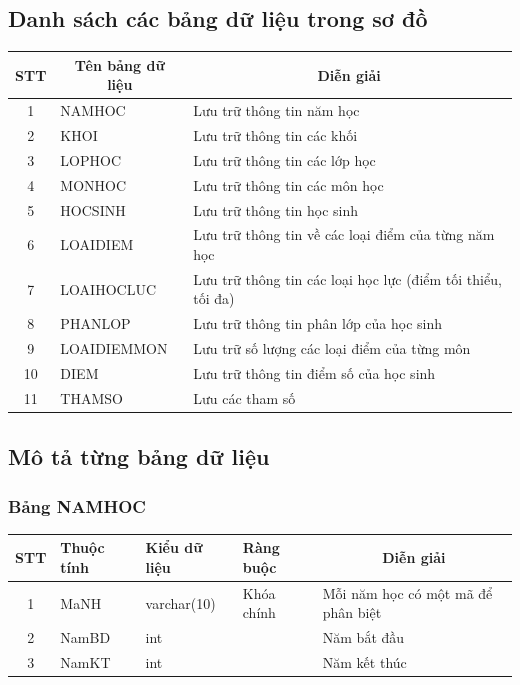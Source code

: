 \documentclass[a4paper]{article}
\begin{document}
	\subsection{Danh sách các bảng dữ liệu trong sơ đồ}
	\begin{table}[H]
\centering
\renewcommand{\arraystretch}{1.5}
\setlength{\tabcolsep}{12pt}
\begin{tabular}{|c|l|p{10cm}|}
\hline
\textbf{STT} & \multicolumn{1}{|c|}{\textbf{Tên bảng dữ liệu}} & \multicolumn{1}{|c|}{\textbf{Diễn giải}} \\
\hline
1 & NAMHOC & Lưu trữ thông tin năm học\\
\hline
2 & KHOI & Lưu trữ thông tin các khối\\
\hline
3 & LOPHOC & Lưu trữ thông tin các lớp học\\
\hline
4 & MONHOC & Lưu trữ thông tin các môn học\\
\hline
5 & HOCSINH & Lưu trữ thông tin học sinh\\
\hline
6 & LOAIDIEM & Lưu trữ thông tin về các loại điểm của từng năm học\\
\hline
7 & LOAIHOCLUC & Lưu trữ thông tin các loại học lực (điểm tối thiểu, tối đa)\\
\hline
8 & PHANLOP & Lưu trữ thông tin phân lớp của học sinh\\
\hline
9 & LOAIDIEMMON & Lưu trữ số lượng các loại điểm của từng môn\\
\hline
10 & DIEM & Lưu trữ thông tin điểm số của học sinh\\
\hline
11 & THAMSO & Lưu các tham số\\
\hline

\end{tabular}
\end{table}
	\subsection{Mô tả từng bảng dữ liệu}
\subsubsection{Bảng NAMHOC}
\begin{table}[H]
\centering
\renewcommand{\arraystretch}{1.5}
\setlength{\tabcolsep}{12pt}
\begin{tabular}{|c|l|l|l|p{5cm}|}
\hline
\textbf{STT} & \textbf{Thuộc tính} & \textbf{Kiểu dữ liệu} & \textbf{Ràng buộc} & \multicolumn{1}{|c|}{\textbf{Diễn giải}} \\
\hline
1 & MaNH & varchar(10) & Khóa chính & Mỗi năm học có một mã để phân biệt \\
\hline
2 & NamBD & int & & Năm bắt đầu \\
\hline
3 & NamKT & int & & Năm kết thúc \\
\hline
\end{tabular}
\end{table}
\end{document}
